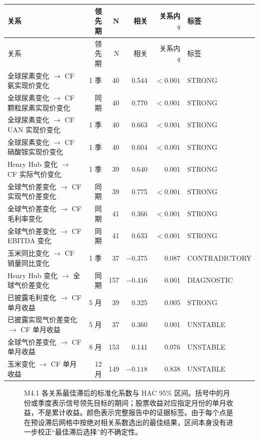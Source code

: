 \documentclass[11pt,a4paper]{ctexart}
\begin{document}
\small
\begin{longtable}{L{5.4cm}r r r r L{1.8cm}}
\toprule
关系 & 领先期 & N & 相关 & 关系内 $q$ & 标签 \\
\midrule
\endfirsthead
\toprule
关系 & 领先期 & N & 相关 & 关系内 $q$ & 标签 \\
\midrule
\endhead
全球尿素变化 $\rightarrow$ CF 氨实现价变化 & 1 季 & 40 & 0.544 & $<0.001$ & STRONG \\
全球尿素变化 $\rightarrow$ CF 颗粒尿素实现价变化 & 同期 & 40 & 0.770 & $<0.001$ & STRONG \\
全球尿素变化 $\rightarrow$ CF UAN 实现价变化 & 1 季 & 40 & 0.663 & $<0.001$ & STRONG \\
全球尿素变化 $\rightarrow$ CF 硝酸铵实现价变化 & 1 季 & 40 & 0.604 & $<0.001$ & STRONG \\
Henry Hub 变化 $\rightarrow$ CF 实际气价变化 & 1 季 & 39 & 0.640 & 0.001 & STRONG \\
全球气价差变化 $\rightarrow$ CF 实现气价差变化 & 同期 & 39 & 0.775 & $<0.001$ & STRONG \\
全球气价差变化 $\rightarrow$ CF 毛利率变化 & 同期 & 41 & 0.366 & $<0.001$ & STRONG \\
全球气价差变化 $\rightarrow$ CF EBITDA 变化 & 同期 & 41 & 0.633 & $<0.001$ & STRONG \\
玉米同比变化 $\rightarrow$ CF 销量同比变化 & 1 季 & 37 & $-0.375$ & 0.087 & CONTRADICTORY \\
Henry Hub 变化 $\rightarrow$ 全球气价差变化 & 同期 & 157 & $-0.416$ & 0.001 & DIAGNOSTIC \\
已披露毛利变化 $\rightarrow$ CF 单月收益 & 5 月 & 39 & 0.325 & 0.005 & STRONG \\
已披露实现气价差变化 $\rightarrow$ CF 单月收益 & 5 月 & 37 & 0.360 & 0.001 & UNSTABLE \\
全球气价差变化 $\rightarrow$ CF 单月收益 & 8 月 & 153 & 0.141 & 0.076 & UNSTABLE \\
玉米变化 $\rightarrow$ CF 单月收益 & 12 月 & 149 & $-0.118$ & 0.838 & UNSTABLE \\
\bottomrule
\end{longtable}
\normalsize

\begin{figure}[htbp]
\centering

\caption{M4.1 各关系最佳滞后的标准化系数与 HAC 95\% 区间。括号中的月份或季度表示信号领先目标的期间；股票收益对应指定月份的单月收益，不是累计收益。颜色表示完整报告中的证据标签。由于每个点是在预设滞后网格中按绝对相关系数选出的最佳结果，区间本身没有进一步校正“最佳滞后选择”的不确定性。}
\label{fig:cf-lead-lag-best-coefficients}
\end{figure}
\end{document}

